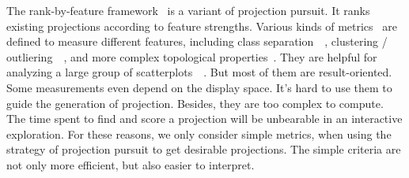 The rank-by-feature framework~\cite{DBLP:journals/ivs/SeoS05} is a variant of projection pursuit. It ranks existing projections according to feature strengths. Various kinds of metrics~\cite{DBLP:conf/ieeevast/AlbuquerqueEM11} are defined to measure different features, including class separation~\cite{DBLP:journals/cgf/SipsNLH09}~\cite{DBLP:journals/cgf/SedlmairTMT12}, clustering / outliering~\cite{DBLP:conf/ieeevast/TatuAESTMK09}~\cite{DBLP:journals/tvcg/JohanssonJ09}, and more complex topological properties~\cite{DBLP:conf/infovis/WilkinsonAG05}. They are helpful for analyzing a large group of scatterplots~\cite{DBLP:conf/apvis/NhonW14}~\cite{DBLP:conf/ieeevast/AnandWN12}. But most of them are result-oriented. Some measurements even depend on the display space. It's hard to use them to guide the generation of projection. Besides, they are too complex to compute. The time spent to find and score a projection will be unbearable in an interactive exploration. For these reasons, we only consider simple metrics, when using the strategy of projection pursuit to get desirable projections. The simple criteria are not only more efficient, but also easier to interpret.
